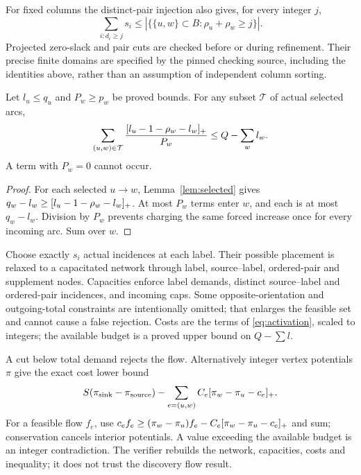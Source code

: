 \documentclass[11pt,a4paper]{article}
\begin{document}
For fixed columns the distinct-pair injection also gives, for every integer $j$,
\begin{equation}\label{eq:paircut}
 \sum_{i:d_i\ge j}s_i\le |\{\{u,w\}\subset B:\rho_u+\rho_w\ge j\}|.
\end{equation}
Projected zero-slack and pair cuts are checked before or during refinement. Their precise finite domains are specified by the pinned checking source, including the identities above, rather than an assumption of independent column sorting.

\begin{lemma}\label{lem:activation}
Let $l_u\le q_u$ and $P_w\ge p_w$ be proved bounds. For any subset $\mathcal T$ of actual selected arcs,
\begin{equation}\label{eq:activation}
 \sum_{(u,w)\in\mathcal T}\frac{[l_u-1-\rho_w-l_w]_+}{P_w}
 \le Q-\sum_wl_w.
\end{equation}
A term with $P_w=0$ cannot occur.
\end{lemma}
\begin{proof}
For each selected $u\to w$, Lemma~\ref{lem:selected} gives
$q_w-l_w\ge[l_u-1-\rho_w-l_w]_+$. At most $P_w$ terms enter $w$, and each is at most $q_w-l_w$. Division by $P_w$ prevents charging the same forced increase once for every incoming arc. Sum over $w$.
\end{proof}
Choose exactly $s_i$ actual incidences at each label. Their possible placement is relaxed to a capacitated network through label, source--label, ordered-pair and supplement nodes. Capacities enforce label demands, distinct source--label and ordered-pair incidences, and incoming caps. Some opposite-orientation and outgoing-total constraints are intentionally omitted; that enlarges the feasible set and cannot cause a false rejection. Costs are the terms of \eqref{eq:activation}, scaled to integers; the available budget is a proved upper bound on $Q-\sum l$.

A cut below total demand rejects the flow. Alternatively integer vertex potentials $\pi$ give the exact cost lower bound
\begin{equation}\label{eq:flowdual}
 S(\pi_{\rm sink}-\pi_{\rm source})-
 \sum_{e=(u,w)}C_e[\pi_w-\pi_u-c_e]_+.
\end{equation}
For a feasible flow $f_e$, use
$c_ef_e\ge(\pi_w-\pi_u)f_e-C_e[\pi_w-\pi_u-c_e]_+$ and sum; conservation cancels interior potentials. A value exceeding the available budget is an integer contradiction. The verifier rebuilds the network, capacities, costs and inequality; it does not trust the discovery flow result.
\end{document}
